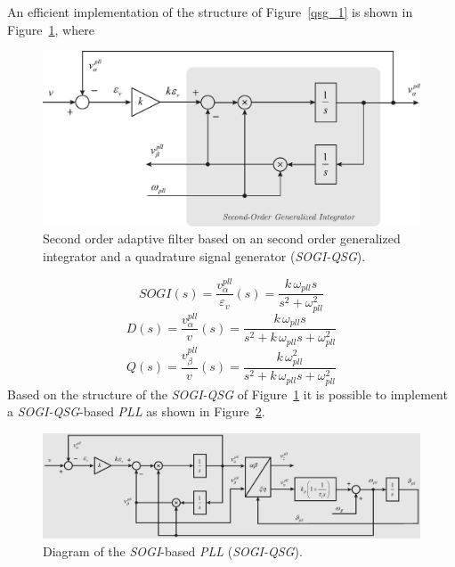 \documentclass[11pt,a4paper,oneside]{book}
\numberwithin{equation}{section}
\theoremstyle{it}
\theoremstyle{definition}
\begin{document}
An efficient implementation of the structure of Figure~\ref{qsg_1} is shown in Figure~\ref{sogi_1}, where
\begin{figure}[H]
	\centering
	\includegraphics[width = 325pt, angle = 0, 
	keepaspectratio]{figures/sogi_1.eps}
	\captionsetup{width=0.5\textwidth, font=small}	
	\caption{Second order adaptive filter based on an second order generalized integrator and a quadrature signal generator (\textit{SOGI-QSG}).}
	\label{sogi_1}
\end{figure}
\begin{equation}\label{sogi_pll_eq3}
	\textit{SOGI}(s)=\frac{v_\alpha^{pll}}{\varepsilon_{v}}(s)=\frac{k\,\omega_{pll}s}{s^2+\omega_{pll}^2}
\end{equation}
\begin{equation}\label{sogi_pll_eq4}
	\textit{D}(s)=\frac{v_\alpha^{pll}}{v_{}}(s)=\frac{k\,\omega_{pll}s}{s^2+k\,\omega_{pll}s+\omega_{pll}^2}
\end{equation}
\begin{equation}\label{sogi_pll_eq5}
	\textit{Q}(s)=\frac{v_\beta^{pll}}{v_{}}(s)=\frac{k\,\omega_{pll}^2}{s^2+k\,\omega_{pll}s+\omega_{pll}^2}
\end{equation}
Based on the structure of the \textit{SOGI-QSG} of Figure~\ref{sogi_1} it is possible to implement a \textit{SOGI-QSG}-based \textit{PLL} as shown in Figure~\ref{sogi_pll_1}.
\begin{figure}[H]
	\centering
	\includegraphics[width = 495pt, angle = 0, 
	keepaspectratio]{figures/sogi_pll_2.eps}
	\captionsetup{width=0.5\textwidth, font=small}	
	\caption{Diagram of the \textit{SOGI}-based \textit{PLL} (\textit{SOGI-QSG}).}
	\label{sogi_pll_1}
\end{figure}
\end{document}
